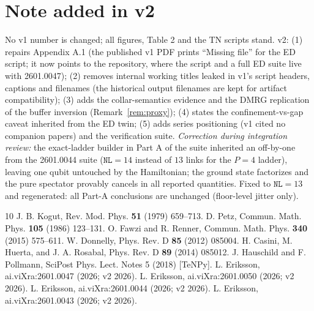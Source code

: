 \documentclass[11pt]{article}
\theoremstyle{remark}
\begin{document}
\section*{Note added in v2}
No v1 number is changed; all figures, Table 2 and the TN scripts stand.
v2: (1) repairs Appendix A.1 (the published v1 PDF prints ``Missing
file'' for the ED script; it now points to the repository, where the
script and a full ED suite live with 2601.0047); (2) removes internal
working titles leaked in v1's script headers, captions and filenames
(the historical output filenames are kept for artifact compatibility);
(3) adds the collar-semantics evidence and the DMRG replication of the
buffer inversion (Remark~\ref{rem:proxy}); (4) states the
confinement-vs-gap caveat inherited from the ED twin; (5) adds series
positioning (v1 cited no companion papers) and the verification suite.
\emph{Correction during integration review:} the exact-ladder builder in
Part A of the suite inherited an off-by-one from the 2601.0044 suite
($\texttt{NL} = 14$ instead of $13$ links for the $P = 4$ ladder),
leaving one qubit untouched by the Hamiltonian; the ground state
factorizes and the pure spectator provably cancels in all reported
quantities. Fixed to $\texttt{NL} = 13$ and regenerated: all Part-A
conclusions are unchanged (floor-level jitter only).

\begin{thebibliography}{10}
 J. B. Kogut, Rev. Mod. Phys. \textbf{51} (1979)
659--713.
 D. Petz, Commun. Math. Phys. \textbf{105} (1986)
123--131.
 O. Fawzi and R. Renner, Commun. Math. Phys. \textbf{340}
(2015) 575--611.
 W. Donnelly, Phys. Rev. D \textbf{85} (2012) 085004.
 H. Casini, M. Huerta, and J. A. Rosabal, Phys. Rev. D
\textbf{89} (2014) 085012.
 J. Hauschild and F. Pollmann, SciPost Phys. Lect. Notes
5 (2018) [TeNPy].
 L. Eriksson, ai.viXra:2601.0047 (2026; v2 2026).
 L. Eriksson, ai.viXra:2601.0050 (2026; v2 2026).
 L. Eriksson, ai.viXra:2601.0044 (2026; v2 2026).
 L. Eriksson, ai.viXra:2601.0043 (2026; v2 2026).
\end{thebibliography}
\end{document}
